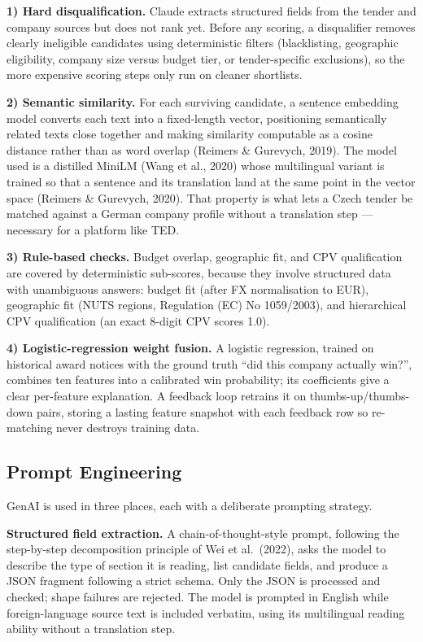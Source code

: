 \textbf{1) Hard disqualification.} Claude extracts structured fields from the tender
and company sources but does not rank yet. Before any scoring, a disqualifier removes
clearly ineligible candidates using deterministic filters (blacklisting, geographic
eligibility, company size versus budget tier, or tender-specific exclusions), so the
more expensive scoring steps only run on cleaner shortlists.

\textbf{2) Semantic similarity.} For each surviving candidate, a sentence embedding
model converts each text into a fixed-length vector, positioning semantically related
texts close together and making similarity computable as a cosine distance rather than
as word overlap (Reimers \& Gurevych, 2019). The model used is a distilled MiniLM
(Wang et al., 2020) whose multilingual variant is trained so that a sentence and its
translation land at the same point in the vector space (Reimers \& Gurevych, 2020).
That property is what lets a Czech tender be matched against a German company profile
without a translation step --- necessary for a platform like TED.

\textbf{3) Rule-based checks.} Budget overlap, geographic fit, and CPV qualification
are covered by deterministic sub-scores, because they involve structured data with
unambiguous answers: budget fit (after FX normalisation to EUR), geographic fit
(NUTS regions, Regulation (EC) No 1059/2003), and hierarchical CPV qualification
(an exact 8-digit CPV scores 1.0).

\textbf{4) Logistic-regression weight fusion.} A logistic regression, trained on
historical award notices with the ground truth ``did this company actually win?'',
combines ten features into a calibrated win probability; its coefficients give a
clear per-feature explanation. A feedback loop retrains it on thumbs-up/thumbs-down
pairs, storing a lasting feature snapshot with each feedback row so re-matching never
destroys training data.

\subsection{Prompt Engineering}
GenAI is used in three places, each with a deliberate prompting strategy.

\textbf{Structured field extraction.} A chain-of-thought-style prompt, following the
step-by-step decomposition principle of Wei et al.\ (2022), asks the model to describe
the type of section it is reading, list candidate fields, and produce a JSON fragment
following a strict schema. Only the JSON is processed and
checked; shape failures are rejected. The model is prompted in English while
foreign-language source text is included verbatim, using its multilingual reading
ability without a translation step.

